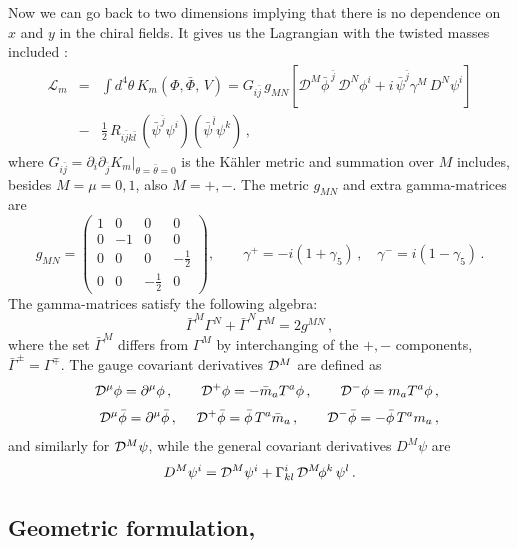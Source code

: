 \documentclass[epsfig,12pt]{article}
\def\beq{\begin{equation}}
\def\eeq{\end{equation}}
\def\beqn{\begin{eqnarray}}
\def\eeqn{\end{eqnarray}}
\newcommand{\cde}{{\mathcal D}}
\def\beqn{\begin{eqnarray}}
\def\eeqn{\end{eqnarray}}
\def\beq{\begin{equation}}
\def\eeq{\end{equation}}
\begin{document}
{Now we can go back to two dimensions implying that there is no dependence
on $x$ and $y$ in the chiral fields.  It gives us the Lagrangian with the twisted masses 
included \cite{twisted, Dor}:
\beqn
\label{eq:mtwist}
{\mathcal L}_{m}
&=&
 \int d^{4 }\theta \,K_{m}(\Phi, \bar\Phi,\,V)
=G_{i\bar j}\, g_{MN}\left[ {\cde}^M \bar\phi^{\,\bar j}\, {\cde}^{N} \phi^{i}
+i\,\bar \psi^{\bar j} \gamma^{M}\,D^{N} \psi^{i}\right]
\nonumber\\[3mm]
&-&
\frac{1}{2}\,R_{i\bar jk\bar l}\,(\bar\psi^{\bar j}\psi^{i})(\bar\psi^{\bar l}\psi^{k})\,,
\eeqn
where $G_{i\bar j} =\partial_{i}\partial_{\bar j}K_{m}|_{\theta=\bar\theta=0}$ is the K\"ahler metric 
and summation over $M$ includes, besides $M=\mu=0,1$, also 
$M=+,-$. 
The  metric $g_{MN}$ and extra gamma-matrices are
\begin{equation}
\label{eq:metric}
g_{MN}=\left(\begin{array}{crrr}1& 0& 0 & 0 \\0 & -1 & 0 & 0 \\[1mm]0 & 0 & 0 & -\frac 1 2 \\[1mm]0 & 0 & -\frac 1 2 & 0\end{array}\right),\qquad
\gamma^{+}=-i(1+\gamma_{5})\,,\quad
\gamma^{-}=i(1-\gamma_{5})\,.
\end{equation}
The gamma-matrices satisfy the following algebra:
\beq
\bar\Gamma^{M}\Gamma^{N}+\bar\Gamma^{N}\Gamma^{M}=2 g^{MN}\,,
\eeq
where the set $\bar\Gamma^{M}$ differs from $\Gamma^{M}$  by interchanging of
the $+,-$ components, $\bar\Gamma^{\pm}=\Gamma^{\mp}$.
The gauge covariant derivatives ${\cal D}^M$ are defined as
\beqn
&&
{\mathcal D}^{\mu}\phi=\partial^{\mu}\phi\,,\qquad {\cal D}^{+}\phi=-\bar m_{a}T^{a}\phi\,,
\qquad  {\cal D}^{-}\phi=m_{a}T^{a}\phi\,,
\nonumber\\[1mm]
&& {\cal D}^{\mu}\bar\phi
=\partial^{\mu}\bar\phi\,,
\quad ~{\cde}^{+}\bar\phi =\bar\phi\, T^{a}\bar m_{a}\,,
\qquad  {\cde}^{-}\bar\phi =-\bar \phi\, T^{a} m_{a}\,,
\nonumber\\
\eeqn
and similarly for ${\cal D}^{M}\psi$, while the general covariant derivatives $D^{M}\psi$ are
\begin{equation}
D^{M}\psi^{i}=
{\cal D}^{M}\psi^{i}+\Gamma^{i}_{kl}\,{\cal D}^{M}\! \phi^{k}\,\psi^{l}\,.
\end{equation}


\subsection{Geometric formulation, } 
\label{gftgnz}

}
\end{document}
